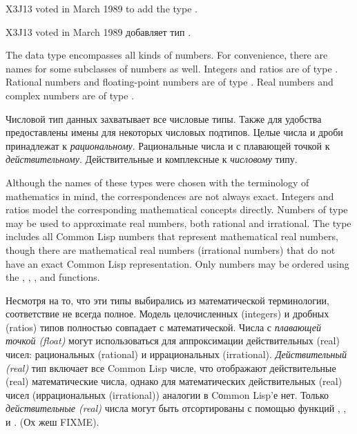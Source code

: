 \begin{newer}
X3J13 voted in March 1989  to add the type .

X3J13 voted in March 1989  добавляет тип .

The  data type encompasses all kinds of
             numbers.  For convenience, there are names for some
             subclasses of numbers as well.  Integers and ratios are of
             type .  Rational numbers and floating-point
             numbers are of type .  Real numbers and complex
             numbers are of type .

Числовой тип данных захватывает все числовые типы. Также для
удобства предоставлены имены для некоторых числовых
подтипов. Целые числа и дроби принадлежат к
\emph{рациональному}. Рациональные числа и с плавающей точкой к
\emph{действительному}. Действительные и комплексные к \emph{числовому} типу.

             Although the names of these types were chosen with the
             terminology of mathematics in mind, the correspondences
             are not always exact.  Integers and ratios model the
             corresponding mathematical concepts directly.  Numbers
             of type  may be used to approximate real
             numbers, both rational and irrational.  The  type
             includes all Common Lisp numbers that represent
             mathematical real numbers, though there are
             mathematical real numbers (irrational numbers)
             that do not have an exact Common Lisp representation.
             Only  numbers may be ordered using the \cdf{<}, \cdf{>}, \cdf{<=},
             and \cdf{>=} functions.

Несмотря на то, что эти типы выбирались из математической
терминологии, соответствие не всегда полное. Модель целочисленных
(integers) и дробных (ratios) типов полностью совпадает с
математической. Числа с \emph{плавающей точкой (float)} могут
использоваться для аппроксимации действительных (real) чисел:
рациональных (rational) и иррациональных
(irrational). \emph{Действительный (real)} тип включает все Common Lisp
числе, что отображают действительные (real) математические числа,
однако для математических действительных (real) чисел
(иррациональных (irrational)) аналогии в Cоmmon Lisp'е нет. Только
\emph{действительные (real)} числа могут быть отсортированы с помощью
функций \cdf{<}, \cdf{>}, \cdf{<=} и \cdf{>=}. (Ох жеш FIXME). 


\end{newer}
